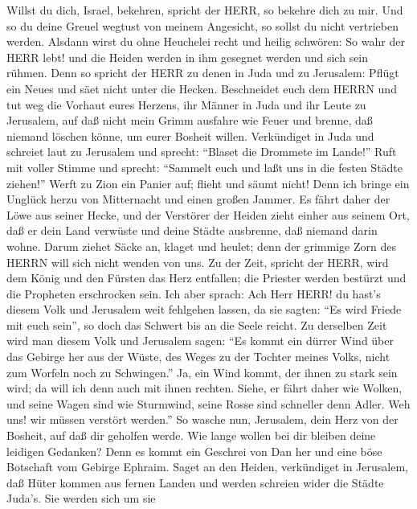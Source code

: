  Willst du dich, Israel, bekehren, spricht der HERR, so
bekehre dich zu mir. Und so du deine Greuel wegtust von meinem
Angesicht, so sollst du nicht vertrieben werden.  Alsdann
wirst du ohne Heuchelei recht und heilig schwören: So wahr der HERR
lebt! und die Heiden werden in ihm gesegnet werden und sich sein rühmen.
 Denn so spricht der HERR zu denen in Juda und zu Jerusalem:
Pflügt ein Neues und säet nicht unter die Hecken. 
Beschneidet euch dem HERRN und tut weg die Vorhaut eures Herzens, ihr
Männer in Juda und ihr Leute zu Jerusalem, auf daß nicht mein Grimm
ausfahre wie Feuer und brenne, daß niemand löschen könne, um eurer
Bosheit willen.  Verkündiget in Juda und schreiet laut zu
Jerusalem und sprecht: ``Blaset die Drommete im Lande!'' Ruft mit voller
Stimme und sprecht: ``Sammelt euch und laßt uns in die festen Städte
ziehen!''  Werft zu Zion ein Panier auf; flieht und säumt
nicht! Denn ich bringe ein Unglück herzu von Mitternacht und einen
großen Jammer.  Es fährt daher der Löwe aus seiner Hecke,
und der Verstörer der Heiden zieht einher aus seinem Ort, daß er dein
Land verwüste und deine Städte ausbrenne, daß niemand darin wohne.
 Darum ziehet Säcke an, klaget und heulet; denn der grimmige
Zorn des HERRN will sich nicht wenden von uns.  Zu der Zeit,
spricht der HERR, wird dem König und den Fürsten das Herz entfallen; die
Priester werden bestürzt und die Propheten erschrocken sein.
 Ich aber sprach: Ach Herr HERR! du hast's diesem Volk und
Jerusalem weit fehlgehen lassen, da sie sagten: ``Es wird Friede mit
euch sein'', so doch das Schwert bis an die Seele reicht. 
Zu derselben Zeit wird man diesem Volk und Jerusalem sagen: ``Es kommt
ein dürrer Wind über das Gebirge her aus der Wüste, des Weges zu der
Tochter meines Volks, nicht zum Worfeln noch zu Schwingen.''
 Ja, ein Wind kommt, der ihnen zu stark sein wird; da will
ich denn auch mit ihnen rechten.  Siehe, er fährt daher wie
Wolken, und seine Wagen sind wie Sturmwind, seine Rosse sind schneller
denn Adler. Weh uns! wir müssen verstört werden.''  So
wasche nun, Jerusalem, dein Herz von der Bosheit, auf daß dir geholfen
werde. Wie lange wollen bei dir bleiben deine leidigen Gedanken?
 Denn es kommt ein Geschrei von Dan her und eine böse
Botschaft vom Gebirge Ephraim.  Saget an den Heiden,
verkündiget in Jerusalem, daß Hüter kommen aus fernen Landen und werden
schreien wider die Städte Juda's.  Sie werden sich um sie
